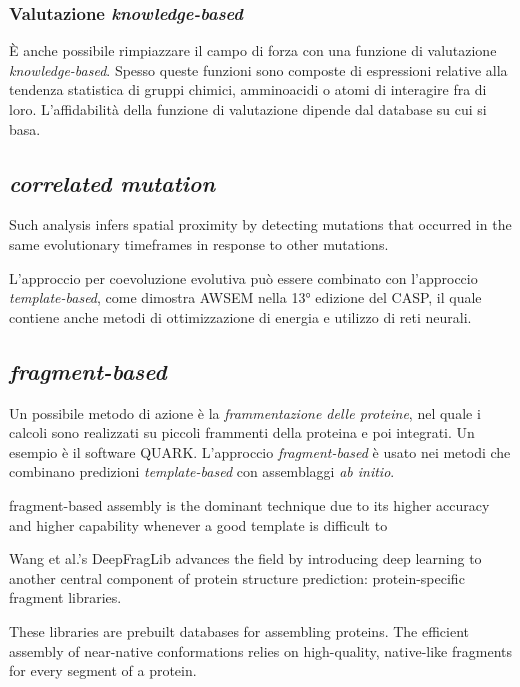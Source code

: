 \subsubsection{Valutazione \textit{knowledge-based}}
\par È anche possibile rimpiazzare il campo di forza con una funzione di valutazione \textit{knowledge-based}. Spesso queste funzioni sono composte di espressioni relative alla tendenza statistica di gruppi chimici, amminoacidi o atomi di interagire fra di loro. L'affidabilità della funzione di valutazione dipende dal database su cui si basa. 


\subsection{\textit{correlated mutation}}


Such analysis infers spatial proximity by
detecting mutations that occurred in the
same evolutionary timeframes in response
to other mutations.

L'approccio per coevoluzione evolutiva può essere combinato con l'approccio \textit{template-based}, come dimostra AWSEM\supercite{jin2020protein} nella 13° edizione del CASP, il quale contiene anche metodi di ottimizzazione di energia e utilizzo di reti neurali.


\subsection{\textit{fragment-based}}
\par Un possibile metodo di azione è la \textit{frammentazione delle proteine}, nel quale i calcoli sono realizzati su piccoli frammenti della proteina e poi integrati. Un esempio è il software QUARK. L'approccio \textit{fragment-based} è usato nei metodi che combinano predizioni \textit{template-based} con assemblaggi \textit{ab initio}.


fragment-based
assembly is the dominant technique due to
its higher accuracy and higher capability
whenever a good template is difficult to



Wang et al.’s DeepFragLib advances
the field by introducing deep learning
to another central component of protein
structure prediction: protein-specific
fragment libraries.

These libraries are
prebuilt databases for assembling proteins.
The efficient assembly of near-native
conformations relies on high-quality,
native-like fragments for every segment of
a protein.



